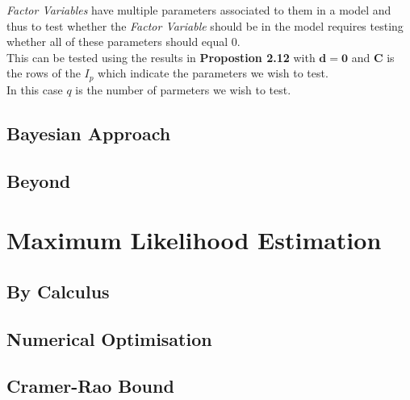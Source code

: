 \documentclass[11pt,a4paper]{article}
\begin{document}
\textit{Factor Variables} have multiple parameters associated to them in a model and thus to test whether the \textit{Factor Variable} should be in the model requires testing whether all of these parameters should equal 0.\\
This can be tested using the results in \textbf{Propostion 2.12} with $\textbf{d}=\pmb0$ and $\textbf{C}$ is the rows of the $I_p$ which indicate the parameters we wish to test.\\
In this case $q$ is the number of parmeters we wish to test. 

\subsection{Bayesian Approach}

\subsection{Beyond}


\section{Maximum Likelihood Estimation}

\subsection{By Calculus}






\subsection{Numerical Optimisation}




\subsection{Cramer-Rao Bound}
\end{document}
